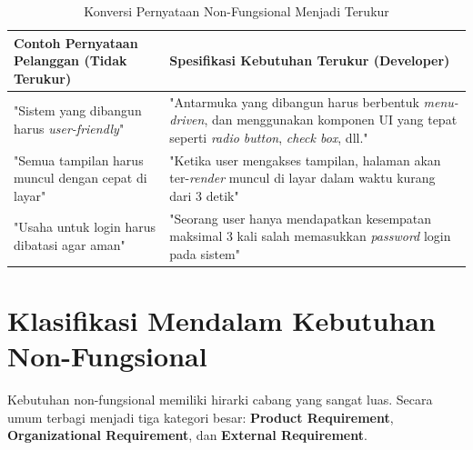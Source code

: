 \documentclass[12pt,a4paper]{article}
\begin{document}
\begin{table}[h]
\centering
\begin{tabular}{@{}p{6.5cm}p{7.5cm}@{}}
\toprule
\textbf{Contoh Pernyataan Pelanggan (Tidak Terukur)} & \textbf{Spesifikasi Kebutuhan Terukur (Developer)} \\ \midrule
"Sistem yang dibangun harus \textit{user-friendly}" & "Antarmuka yang dibangun harus berbentuk \textit{menu-driven}, dan menggunakan komponen UI yang tepat seperti \textit{radio button}, \textit{check box}, dll." \\ \addlinespace
"Semua tampilan harus muncul dengan cepat di layar" & "Ketika user mengakses tampilan, halaman akan ter-\textit{render} muncul di layar dalam waktu kurang dari 3 detik" \\ \addlinespace
"Usaha untuk login harus dibatasi agar aman" & "Seorang user hanya mendapatkan kesempatan maksimal 3 kali salah memasukkan \textit{password} login pada sistem" \\ \bottomrule
\end{tabular}
\caption{Konversi Pernyataan Non-Fungsional Menjadi Terukur}
\end{table}

\newpage
\section{Klasifikasi Mendalam Kebutuhan Non-Fungsional}

Kebutuhan non-fungsional memiliki hirarki cabang yang sangat luas. Secara umum terbagi menjadi tiga kategori besar: \textbf{Product Requirement}, \textbf{Organizational Requirement}, dan \textbf{External Requirement}.
\end{document}
